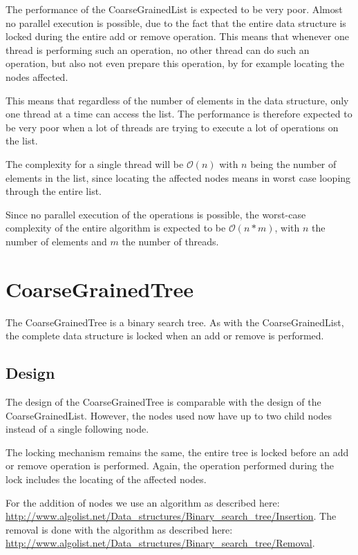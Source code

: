 \documentclass[a4paper]{article}
\def\bigoh{\mathcal{O}}
\begin{document}
The performance of the CoarseGrainedList is expected to be very poor. Almost
no parallel execution is possible, due to the fact that the entire
data structure is locked during the entire add or remove operation. This means
that whenever one thread is performing such an operation, no other thread can
do such an operation, but also not even prepare this operation, by for example
locating the nodes affected.

This means that regardless of the number of elements in the data structure,
only one thread at a time can access the list. The performance is therefore
expected to be very poor when a lot of threads are trying to execute a lot
of operations on the list.

The complexity for a single thread will be $\bigoh(n)$ with $n$ being
the number of elements in the list, since
locating the affected nodes means in worst case looping through the entire
list.

Since no parallel execution of the operations is possible, the worst-case
complexity of the entire algorithm is expected to be $\bigoh(n * m)$,
with $n$ the number of elements and $m$ the number of threads.

\section{CoarseGrainedTree}

The CoarseGrainedTree is a binary search tree. As with the
CoarseGrainedList, the complete data structure is locked when
an add or remove is performed.

\subsection{Design}

The design of the CoarseGrainedTree is comparable with the design of the
CoarseGrainedList. However, the nodes used now have up to two child nodes
instead of a single following node.

The locking mechanism remains the same, the entire tree is locked before
an add or remove operation is performed. Again, the operation performed
during the lock includes the locating of the affected nodes.

For the addition of nodes we use an algorithm as described here:
\url{http://www.algolist.net/Data_structures/Binary_search_tree/Insertion}.
The removal is done with the algorithm as described here:
\url{http://www.algolist.net/Data_structures/Binary_search_tree/Removal}.
\end{document}
